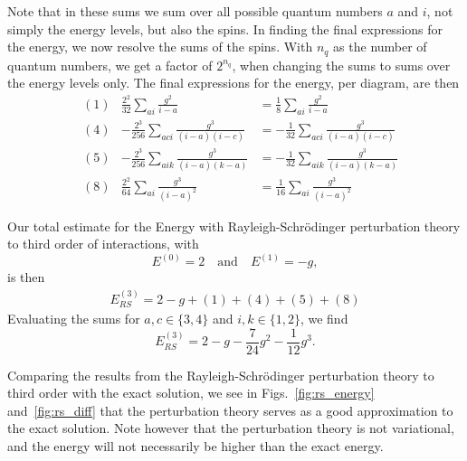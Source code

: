 Note that in these sums we sum over all possible quantum numbers $a$ and $i$, not simply the energy levels, but also the spins.
In finding the final expressions for the energy, we now resolve the sums of the spins.
With $n_q$ as the number of quantum numbers, we get a factor of $2^{n_q}$, when changing the sums to sums over the energy levels only.
The final expressions for the energy, per diagram, are then
\begin{align*}
    & (1) & \frac{2^2}{32} \sum_{ai} \frac{g^2}{i - a} &= \frac{1}{8} \sum_{ai} \frac{g^2}{i - a} \\
    & (4) & -\frac{2^3}{256} \sum_{aci} \frac{g^3}{(i-a)(i-c)} &= -\frac{1}{32} \sum_{aci} \frac{g^3}{(i-a)(i-c)} \\
    & (5) & -\frac{2^3}{256} \sum_{aik} \frac{g^3}{(i-a)(k-a)} &= -\frac{1}{32} \sum_{aik} \frac{g^3}{(i-a)(k-a)} \\
    & (8) & \frac{2^2}{64} \sum_{ai} \frac{g^3}{(i - a)^2} &= \frac{1}{16} \sum_{ai} \frac{g^3}{(i - a)^2} %
\end{align*}

Our total estimate for the Energy with Rayleigh-Schr\"odinger perturbation theory to third order of interactions, with
\begin{equation*}
    E^{(0)} = 2 \quad \text{and} \quad E^{(1)} = - g,
\end{equation*}
is then
\begin{align*}
    E_{RS}^{(3)} = 2 - g + (1) + (4) + (5) + (8)
\end{align*}
Evaluating the sums for $a,c \in \{3, 4\}$ and $i,k \in \{1, 2\}$, we find
\begin{equation*}
    E_{RS}^{(3)} %
    = 2 - g - \frac{7}{24} g^2 - \frac{1}{12} g^3.
\end{equation*}

Comparing the results from the Rayleigh-Schr\"odinger perturbation theory to third order with the exact solution, we see in Figs.~\ref{fig:rs_energy} and~\ref{fig:rs_diff} that the perturbation theory serves as a good approximation to the exact solution.
Note however that the perturbation theory is not variational, and the energy will not necessarily be higher than the exact energy.

